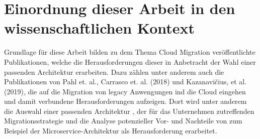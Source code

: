 \section{Einordnung dieser Arbeit in den wissenschaftlichen Kontext}

Grundlage für diese Arbeit bilden zu dem Thema Cloud Migration veröffentlichte Publikationen, welche die Herausforderungen
dieser in Anbetracht der Wahl einer passenden Architektur erarbeiten. Dazu zählen unter anderem auch die Publikationen
von Pahl et. al., Carrasco et. al. (2018) und Kazanavičius, et al. (2019), die auf die Migration von legacy Anwengungen
ind die Cloud eingehen und damit verbundene Herausforderungen aufzeigen. Dort wird unter anderem die Auswahl einer
passenden Architektur \cite[Vgl.][S. 14]{Pahl}, der für das Unternehmen zutreffenden Migrationsstrategie
\cite[Vgl.][S. 4]{Kazanavicius2019} und die Analyse potenzieller Vor- und Nachteile von zum Beispiel der
Microservice-Architektur \cite[Vgl.][S. 3]{Carrasco2018} als Herausforderung erarbeitet.